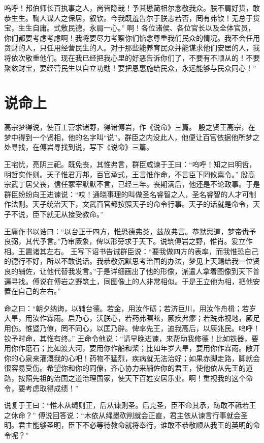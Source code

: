 \documentclass[a4paper,12pt,UTF8,twoside]{ctexbook}
\begin{document}
呜呼！邦伯师长百执事之人，尚皆隐哉！予其懋简相尔念敬我众。朕不肩好货，敢恭生生。鞠人谋人之保居，叙钦。今我既羞告尔于朕志若否，罔有弗钦！无总于货宝，生生自庸。式敷民德，永肩一心。”
啊！各位诸侯、各位官长以及全体官员，你们都要考虑考虑啊！我将要尽力考察你们惦念尊重我们民众的情况。我不会任用贪财的人，只任用经营民生的人。对于那些能养育民众并能谋求他们安居的人，我将依次敬重他们。现在我已经把我心里的好恶告诉你们了，不要有不顺从的！不要聚敛财宝，要经营民生以自立功勋！要把恩惠施给民众，永远能够与民众同心！”

\chapter{说命上}

高宗梦得说，使百工营求诸野，得诸傅岩，作《说命》三篇。
殷之贤王高宗，在梦中得到一个贤相，他的名字叫“说”。群臣之内没此人，他便让百官依据他所梦之处寻找，在傅岩寻找到说，写下《说命》三篇。

王宅忧，亮阴三祀。既免丧，其惟弗言，群臣咸谏于王曰：“呜呼！知之曰明哲，明哲实作则。天子惟君万邦，百官承式，王言惟作命，不言臣下罔攸禀令。”
殷高宗武丁居父丧，信任冢宰默默不言，已经三年。丧期满后，他还是不论政事。于是群臣纷纷向王进谏说：“哎！通晓事理的叫做圣名睿智之人，圣名睿智的人才可制作法则。天子统治天下，文武百官都按照天子的命令行事。天子的话就是命令，天子不说，臣下就无从接受教命。”

王庸作书以诰曰：“以台正于四方，惟恐德弗类，兹故弗言。恭默思道，梦帝赉予良弼，其代予言。”乃审厥象，俾以形旁求于天下。说筑傅岩之野，惟肖。爰立作相。王置诸其左右。
王写下诏书告诫群臣说：“要我做四方的表率，而我惟恐自己的德行不好，所以不敢说话。我恭敬沉默思考治国的办法，梦见上天赐给我一位贤良的辅佐，让他代替我发言。”于是详细画出了他的形像，派遣人拿着图像到天下普遍寻找。傅说在傅岩之野筑土，同图像上的人非常相似。于是王立他为相，把他安置在自己的左右。”

命之曰：“朝夕纳诲，以辅台德。若金，用汝作砺；若济巨川，用汝作舟楫；若岁大旱，用汝作霖雨。启乃心，沃朕心，若药弗瞑眩，厥疾弗瘳；若跣弗视地，厥足用伤。惟暨乃僚，罔不同心，以匡乃辟。俾率先王，迪我高后，以康兆民。呜呼！钦予时命，其惟有终。”
王命令他说：“请早晚进谏，来帮助我修德！比如铁器，要用你作磨石；比如渡大河，要用你作船和桨；比如年岁大旱，要用你作霖雨。敞开你的心泉来灌溉我的心吧！药物不猛烈，疾病就无法治好；如果赤脚走路，脚就会很容易受伤。希望你和你的同僚，齐心协力来辅佐你的君王，使他依从先王的道路，按照先祖的治国之道治理国家，使天下百姓安居乐业。啊！重视我的这个命令，要考虑取得成绩！”

说复于王曰：“惟木从绳则正，后从谏则圣。后克圣，臣不命其承，畴敢不祗若王之休命？”
傅说回答说：“木依从绳墨砍削就会正直，君主依从谏言行事就会圣明。君主能够圣明，臣下不必等待教命就将奉行，谁敢不恭敬顺从我王的英明的命令呢？”
\end{document}
